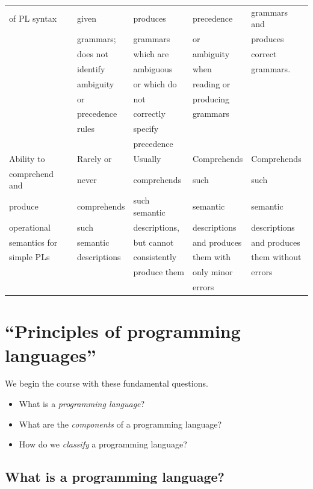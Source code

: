 \documentclass[11pt]{article}
\theoremstyle{definition}
\begin{document}
\begin{scriptsize}
\begin{center}
\begin{tabular}{|l|l|l|l|l|}
of PL syntax & given & produces & precedence & grammars and \\
 & grammars; & grammars & or & produces \\
 & does not & which are & ambiguity & correct \\
 & identify & ambiguous & when & grammars. \\
 & ambiguity & or which do & reading or & \\
 & or & not & producing & \\
 & precedence & correctly & grammars & \\
 & rules & specify & & \\
 & & precedence & & \\
\hline
Ability to & Rarely or & Usually & Comprehends & Comprehends \\
comprehend and & never & comprehends & such & such \\
produce & comprehends & such semantic & semantic & semantic \\
operational & such & descriptions, & descriptions & descriptions \\
semantics for & semantic & but cannot & and produces & and produces \\
simple PLs & descriptions & consistently & them with & them without \\
 & & produce them & only minor & errors \\
 & & & errors & \\
\hline
\end{tabular}
\end{center}
\end{scriptsize}

\section{“Principles of programming languages”}
\label{sec:org7e487cb}
We begin the course with these fundamental questions.

\begin{itemize}
\item What is a \emph{programming language}?
\item What are the \emph{components} of a programming language?
\item How do we \emph{classify} a programming language?
\end{itemize}

\subsection{What is a programming language?}
\label{sec:orgf770cc7}
\end{document}
